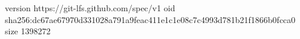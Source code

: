 version https://git-lfs.github.com/spec/v1
oid sha256:dc67ae67970d331028a791a9feac411e1c1e08c7c4993d781b21f1866b0fcca0
size 1398272
